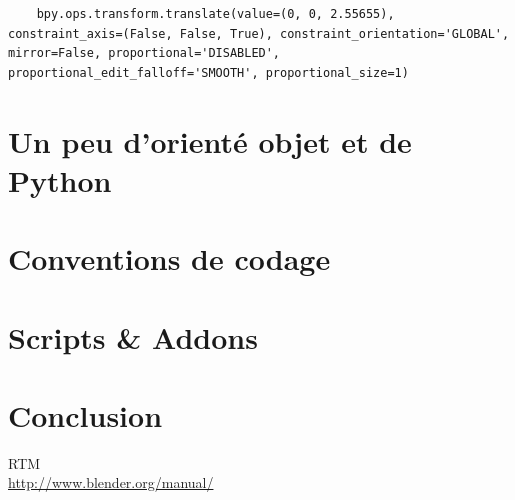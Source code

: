 \documentclass[11pt,usenames,dvipsnames]{beamer}
\begin{document}
\begin{frame}[fragile]
  \begin{lstlisting}
    bpy.ops.transform.translate(value=(0, 0, 2.55655), constraint_axis=(False, False, True), constraint_orientation='GLOBAL', mirror=False, proportional='DISABLED', proportional_edit_falloff='SMOOTH', proportional_size=1)
  \end{lstlisting}
\end{frame}


\section{Un peu d'orienté objet et de Python}

\section{Conventions de codage}

\section{Scripts \& Addons}

\section{Conclusion}
\begin{frame}
  RTM\\
  \url{http://www.blender.org/manual/}
\end{frame}
\end{document}
